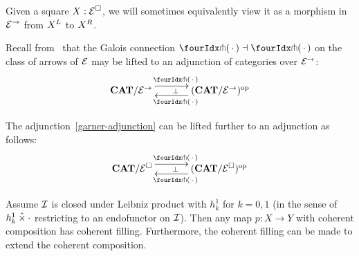 \documentclass[reqno,10pt,a4paper,oneside]{amsart}
\begin{document}
Given a square $X : \catE^{\Box}$, we will sometimes equivalently view it as a morphism in $\catE^{\to}$ from $X\sql$ to $X\sqr$.

Recall from~\cite{garner:small-object-argument} that the Galois connection $\liftl{\brarghole} \dashv \liftr{\brarghole}$ on the class of arrows of $\catE$ may be lifted to an adjunction of categories over $\catE^{\to}$:
\begin{equation}
\label{garner-adjunction}
\begin{gathered}
\xymatrix@C+1em{
  \CAT/\catE^{\to}
  \ar@<5pt>[r]^{\liftl{\brarghole}}
  \ar@{}[r]|{\bot}
&
  (\CAT/\catE^{\to})^{\op}
  \ar@<5pt>[l]^{\liftr{\brarghole}}
}
\end{gathered}
\end{equation}

\begin{lemma}
 \label{garner-adjunction-extended}
The adjunction~\eqref{garner-adjunction} can be lifted further to an adjunction as follows:
\begin{equation}
\label{garner-adjunction-extended}
\begin{gathered}
\xymatrix@C+1em{
  \CAT/\catE^{\Box}
  \ar@<5pt>[r]^{\liftl{\brarghole}}
  \ar@{}[r]|{\bot}
&
  (\CAT/\catE^{\Box})^{\op}
  \ar@<5pt>[l]^{\liftr{\brarghole}}
}
\end{gathered}
\end{equation}
\end{lemma}

\begin{theorem}
Assume $\cal{I}$ is closed under Leibniz product with $h_k^1$ for $k = 0, 1$ (in the sense of $h_k^1 \hattimes \arghole$ restricting to an endofunctor on $\cal{I}$).
Then any map $p : X \to Y$ with coherent composition has coherent filling.
Furthermore, the coherent filling can be made to extend the coherent composition.
\end{theorem}
\end{document}
